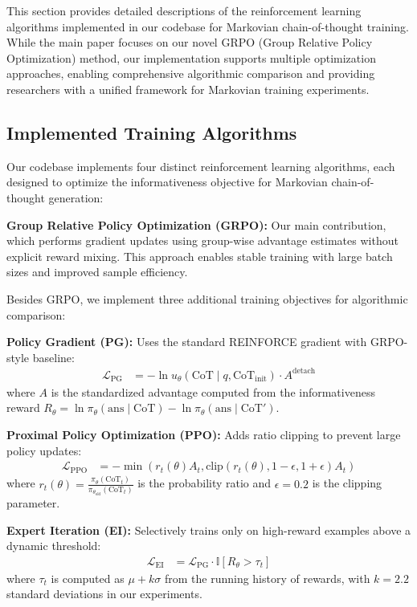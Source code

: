 \documentclass{article}
\begin{document}
This section provides detailed descriptions of the reinforcement learning algorithms implemented in our codebase for Markovian chain-of-thought training. While the main paper focuses on our novel GRPO (Group Relative Policy Optimization) method, our implementation supports multiple optimization approaches, enabling comprehensive algorithmic comparison and providing researchers with a unified framework for Markovian training experiments.

\subsection{Implemented Training Algorithms}

Our codebase implements four distinct reinforcement learning algorithms, each designed to optimize the informativeness objective for Markovian chain-of-thought generation:

\textbf{Group Relative Policy Optimization (GRPO):} Our main contribution, which performs gradient updates using group-wise advantage estimates without explicit reward mixing. This approach enables stable training with large batch sizes and improved sample efficiency.

Besides GRPO, we implement three additional training objectives for algorithmic comparison:

\textbf{Policy Gradient (PG):} Uses the standard REINFORCE gradient with GRPO-style baseline:
\begin{align}
\mathcal{L}_{\text{PG}} &= -\ln u_\theta(\text{CoT} \mid q, \text{CoT}_{\text{init}}) \cdot A^{\text{detach}}
\end{align}
where $A$ is the standardized advantage computed from the informativeness reward $R_\theta = \ln \pi_\theta(\text{ans} \mid \text{CoT}) - \ln \pi_\theta(\text{ans} \mid \text{CoT}')$.

\textbf{Proximal Policy Optimization (PPO):} Adds ratio clipping to prevent large policy updates:
\begin{align}
\mathcal{L}_{\text{PPO}} &= -\min(r_t(\theta) A_t, \text{clip}(r_t(\theta), 1-\epsilon, 1+\epsilon) A_t)
\end{align}
where $r_t(\theta) = \frac{\pi_\theta(\text{CoT}_t)}{\pi_{\theta_{\text{old}}}(\text{CoT}_t)}$ is the probability ratio and $\epsilon = 0.2$ is the clipping parameter.

\textbf{Expert Iteration (EI):} Selectively trains only on high-reward examples above a dynamic threshold:
\begin{align}
\mathcal{L}_{\text{EI}} &= \mathcal{L}_{\text{PG}} \cdot \mathbb{I}[R_\theta > \tau_t]
\end{align}
where $\tau_t$ is computed as $\mu + k\sigma$ from the running history of rewards, with $k = 2.2$ standard deviations in our experiments.
\end{document}
